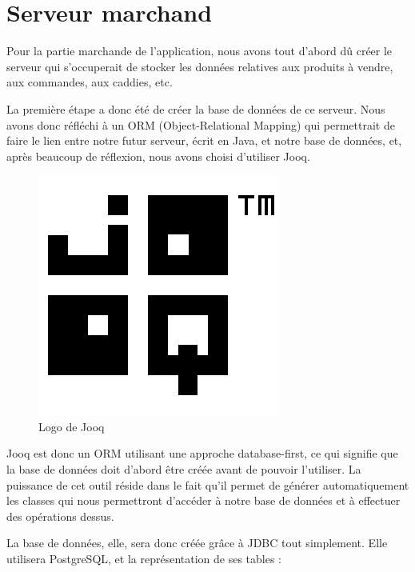 
\section{Serveur marchand}

Pour la partie marchande de l'application, nous avons tout d'abord dû créer le serveur qui s'occuperait de
stocker les données relatives aux produits à vendre, aux commandes, aux caddies, etc.

La première étape a donc été de créer la base de données de ce serveur. Nous avons donc réfléchi à un
ORM (Object-Relational Mapping) qui permettrait de faire le lien entre notre futur serveur, écrit en Java,
et notre base de données, et, après beaucoup de réflexion, nous avons choisi d'utiliser Jooq.

\begin{figure}[H]
    \centering
    \includegraphics[scale=.2]{./img/joey-jooq-logo.png}
    \caption{Logo de Jooq}
    \label{fig:jooq-logo}
\end{figure}

Jooq est donc un ORM utilisant une approche database-first, ce qui signifie que la base de données doit
d'abord être créée avant de pouvoir l'utiliser. La puissance de cet outil réside dans le fait qu'il permet de
générer automatiquement les classes qui nous permettront d'accéder à notre base de données et à
effectuer des opérations dessus.

La base de données, elle, sera donc créée grâce à JDBC tout simplement. Elle utilisera PostgreSQL, et la
représentation de ses tables :


